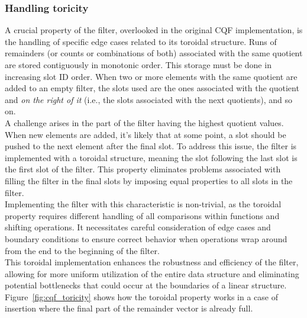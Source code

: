 \subsubsection{Handling toricity}
A crucial property of the filter, overlooked in the original CQF implementation, is the handling of specific edge cases related to its toroidal structure. Runs of remainders (or counts or combinations of both) associated with the same quotient are stored contiguously in monotonic order. This storage must be done in increasing slot ID order. When two or more elements with the same quotient are added to an empty filter, the slots used are the ones associated with the quotient and \emph{on the right of it} (i.e., the slots associated with the next quotients), and so on.\\
A challenge arises in the part of the filter having the highest quotient values. When new elements are added, it's likely that at some point, a slot should be pushed to the next element after the final slot. To address this issue, the filter is implemented with a toroidal structure, meaning the slot following the last slot is the first slot of the filter. This property eliminates problems associated with filling the filter in the final slots by imposing equal properties to all slots in the filter.\\
Implementing the filter with this characteristic is non-trivial, as the toroidal property requires different handling of all comparisons within functions and shifting operations. It necessitates careful consideration of edge cases and boundary conditions to ensure correct behavior when operations wrap around from the end to the beginning of the filter.\\
This toroidal implementation enhances the robustness and efficiency of the filter, allowing for more uniform utilization of the entire data structure and eliminating potential bottlenecks that could occur at the boundaries of a linear structure. Figure~\ref{fig:cqf_toricity} shows how the toroidal property works in a case of insertion where the final part of the remainder vector is already full.
